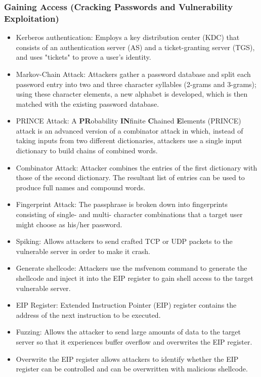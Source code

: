 \subsubsection{Gaining Access (Cracking Passwords and Vulnerability Exploitation)}
\begin{itemize}
    \item Kerberos authentication: Employs a key distribution center (KDC) that consists of an authentication server (AS) and a ticket-granting server (TGS), and uses "tickets" to prove a user's identity.
    \item Markov-Chain Attack: Attackers gather a password database and split each password entry into two and three character syllables (2-grams and 3-grams); using these character elements, a new alphabet is developed, which is then matched with the existing password database.
    \item PRINCE Attack: A \textbf{PR}obability \textbf{IN}finite \textbf{C}hained \textbf{E}lements (PRINCE) attack is an advanced version of a combinator attack in which, instead of taking inputs from two different dictionaries, attackers use a single input dictionary to build chains of combined words.
    \item Combinator Attack: Attacker combines the entries of the first dictionary with those of the second dictionary. The resultant list of entries can be used to produce full names and compound words.
    \item Fingerprint Attack: The passphrase is broken down into fingerprints consisting of single- and multi- character combinations that a target user might choose as his/her password.
    \item Spiking: Allows attackers to send crafted TCP or UDP packets to the vulnerable server in order to make it crash.
    \item Generate shellcode: Attackers use the msfvenom command to generate the shellcode and inject it into the EIP register to gain shell access to the target vulnerable server.
    \item EIP Register: Extended Instruction Pointer (EIP) register contains the address of the next instruction to be executed.
    \item Fuzzing: Allows the attacker to send large amounts of data to the target server so that it experiences buffer overflow and overwrites the EIP register.
    \item Overwrite the EIP register allows attackers to identify whether the EIP register can be controlled and can be overwritten with malicious shellcode.

\end{itemize}
